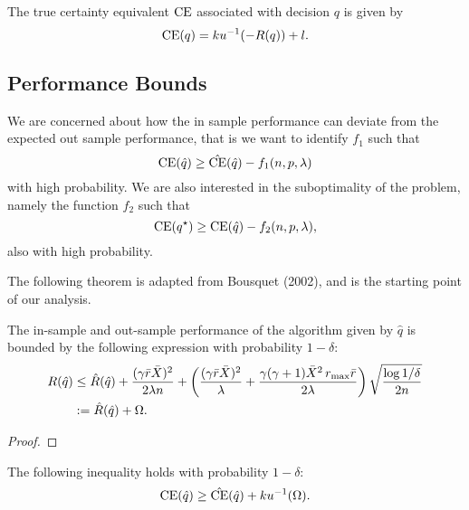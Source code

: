 \documentclass[11pt]{article}
\begin{document}

\begin{deff}
  The true certainty equivalent $\operatorname{CE}$ associated with decision $q$ is given by
  \[
    \operatorname{CE}(q) = ku^{-1}(-R(q)) + l.
  \]
\end{deff}

\subsection{Performance Bounds}

We are concerned about how the in sample performance can deviate from the expected out sample
performance, that is we want to identify $f_1$ such that
\[
  \operatorname{CE}(\hat q) \geq \hat{\operatorname{CE}}(\hat q) - f_1(n,p,\lambda)
\]
with high probability. We are also interested in the suboptimality of the problem, namely
the function $f_2$ such that
\[
  \operatorname{CE}(q^\star) \geq \operatorname{CE}(\hat q) - f_2(n,p,\lambda),
\]
also with high probability. 

The following theorem is adapted from Bousquet (2002), and is the starting point of our
analysis. 

\begin{thm}
  \label{thm1}
  The in-sample and out-sample performance of the algorithm given by $\hat q$ is bounded
  by the following expression with probability $1-\delta$:
  \begin{align*}
    R(\hat q) &\leq \hat R(\hat q) + \frac{(\gamma\bar r\bar X)^2}{2\lambda n} +
    \left(\frac{(\gamma\bar r\bar X)^2}{\lambda} + \frac{\gamma(\gamma+1)\bar X^2\,r_{\max}\bar
    r}{2\lambda}\right)\sqrt{\frac{\log 1/\delta}{2n}}\\
              &:= \hat R(\hat q) + \Omega.
  \end{align*}
\end{thm}

\begin{proof}
\end{proof}

\begin{thm}
  \label{thm2}
  The following inequality holds with probability $1-\delta$:
  \[
    \operatorname{CE}(\hat q) \geq \hat{\operatorname{CE}}(\hat q) + ku^{-1}(\Omega).
  \]
\end{thm}
\end{document}
